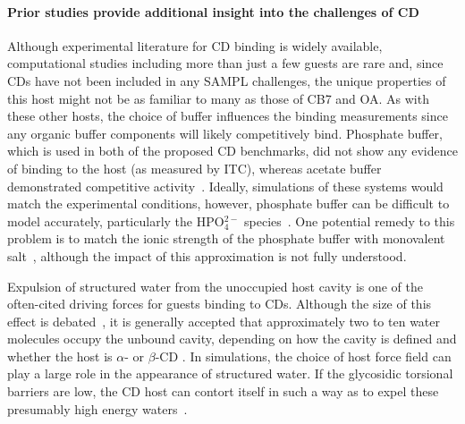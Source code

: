 \documentclass[aps,pre,twocolumn,nofootinbib,superscriptaddress,10pt, final,tightenlines]{revtex4-1}
\begin{document}
\paragraph{Prior studies provide additional insight into the challenges of CD}
Although experimental literature for CD binding is widely available, computational studies including more than just a few guests are rare and, since CDs have not been included in any SAMPL challenges, the unique properties of this host might not be as familiar to many as those of CB7 and OA. 
As with these other hosts, the choice of buffer influences the binding measurements since any organic buffer components will likely competitively bind. 
Phosphate buffer, which is used in both of the proposed CD benchmarks, did not show any evidence of binding to the host (as measured by ITC), whereas acetate buffer demonstrated competitive activity~\cite{rekharsky_thermodynamic_1995, rekharsky_complexation_1998}.
Ideally, simulations of these systems would match the experimental conditions, however, phosphate buffer can be difficult to model accurately, particularly the HPO$_4^{2-}$ species~\cite{henriksen_computational_2015, henriksen_evaluating_2017}.
One potential remedy to this problem is to match the ionic strength of the phosphate buffer with monovalent salt~\cite{henriksen_evaluating_2017}, although the impact of this approximation is not fully understood.

Expulsion of structured water from the unoccupied host cavity is one of the often-cited driving forces for guests binding to CDs.
Although the size of this effect is debated~\cite{Connors:1997:Chem.Rev., taulier_hydrophobic_2006}, it is generally accepted that approximately two to ten water molecules occupy the unbound cavity, depending on how the cavity is defined and whether the host is $\alpha$- or $\beta$-CD \cite{Connors:1997:Chem.Rev., biedermann_hydrophobic_2014}.
In simulations, the choice of host force field can play a large role in the appearance of structured water.
If the glycosidic torsional barriers are low, the CD host can contort itself in such a way as to expel these presumably high energy waters~\cite{henriksen_evaluating_2017}.
\end{document}
